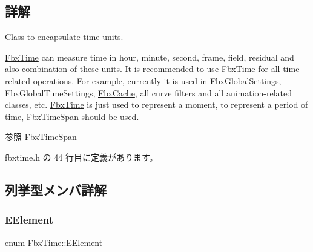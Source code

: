\subsection{詳解}
Class to encapsulate time units.

\hyperlink{class_fbx_time}{Fbx\+Time} can measure time in hour, minute, second, frame, field, residual and also combination of these units. It is recommended to use \hyperlink{class_fbx_time}{Fbx\+Time} for all time related operations. For example, currently it is used in \hyperlink{class_fbx_global_settings}{Fbx\+Global\+Settings}, Fbx\+Global\+Time\+Settings, \hyperlink{class_fbx_cache}{Fbx\+Cache}, all curve filters and all animation-\/related classes, etc. \hyperlink{class_fbx_time}{Fbx\+Time} is just used to represent a moment, to represent a period of time, \hyperlink{class_fbx_time_span}{Fbx\+Time\+Span} should be used. \begin{DoxySeeAlso}{参照}
\hyperlink{class_fbx_time_span}{Fbx\+Time\+Span} 
\end{DoxySeeAlso}


 fbxtime.\+h の 44 行目に定義があります。



\subsection{列挙型メンバ詳解}
\mbox{\label{class_fbx_time_aebc9578f91df69fa2937911047893014}} 
\subsubsection{\texorpdfstring{E\+Element}{EElement}}
{\footnotesize\ttfamily enum \hyperlink{class_fbx_time_aebc9578f91df69fa2937911047893014}{Fbx\+Time\+::\+E\+Element}}

